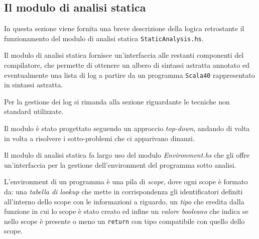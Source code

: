 \subsection{Il modulo di analisi statica}
In questa sezione viene fornita una breve descrizione della logica retrostante il funzionamento del modulo di analisi statica \texttt{StaticAnalysis.hs}.

Il modulo di analisi statica fornisce un'interfaccia alle restanti componenti del compilatore, che permette di ottenere un albero di sintassi astratta annotato ed eventualmente una lista di log a partire da un programma \texttt{Scala40} rappresentato in sintassi astratta.

Per la gestione dei log si rimanda alla sezione riguardante le tecniche non standard utilizzate.

Il modulo è stato progettato seguendo un approccio \textit{top-down}, andando di volta in volta a risolvere i sotto-problemi che ci apparivano dinanzi.

Il modulo di analisi statica fa largo uso del modulo \textit{Environment.hs} che gli offre un'interfaccia per la gestione dell'environment del programma sotto analisi. 

L'environment di un programma è una pila di \textit{scope}, dove ogni scope è formato da: una \textit{tabella di lookup} che mette in corrispondenza gli identificatori definiti all'interno dello scope con le informazioni a riguardo, un \textit{tipo} che eredita dalla funzione in cui lo scope è stato creato ed infine un \textit{valore booleano} che indica se nello scope è presente o meno  un \texttt{return} con tipo compatibile con quello dello scope.

